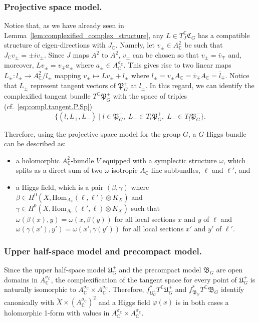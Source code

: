 \documentclass[oneside,11pt]{amsart}
\theoremstyle{definition}
\theoremstyle{remark}
\numberwithin{thm}{section}
\numberwithin{equation}{section}
\begin{document}
\subsubsection{Projective space model.}\label{df:SpR-Higgs-proj}

Notice that, as we have already seen in Lemma~\ref{lem:complexified_complex_structure}, any $L \in T^\mathbb C_{J}\mathfrak{C}_G$ has a compatible structure of eigen-directions with $J_\mathbb C$. Namely, let $v_\pm\in A_\mathbb C^2$ be such that $J_\mathbb C v_\pm=\pm i v_\pm$. Since $J$ maps $A^2$ to $A^2$, $v_\pm$ can be chosen so that $v_\pm=\bar v_\mp$ and, moreover, $Lv_\pm=v_\mp a_\pm$ where $a_\pm\in A_\mathbb C^{\sigma_\mathbb C}$. This gives rise to two linear maps $L_\pm\colon l_\pm\to A_\mathbb C^2/l_\pm$ mapping $v_\pm\mapsto Lv_\pm+l_\pm$ where $l_\pm=v_\pm A_\mathbb C=\bar v_\mp A_\mathbb C=\bar l_\mp$. Notice that $L_\pm$ represent tangent vectors of $\mathfrak{P}_G^+$ at $l_\pm$. In this regard, we can identify the complexified tangent bundle  $T^\mathbb C\mathfrak{P}_G^+$ with the space of triples (cf.~\eqref{eq:compl.tangent.P.Sp})
$$\{(l,L_+,L_-)\mid l\in\mathfrak{P}_G^+,\;L_+\in T_l\mathfrak{P}_G^+,\; L_-\in T_{\bar l}\mathfrak{P}_G^-\}.$$

Therefore, using the projective space model for the group $G$, a $G$-Higgs bundle can be described as: 
\begin{itemize}
    \item a holomorphic $A^2_{\mathbb{C}}$-bundle $V$ equipped with a symplectic structure $\omega$, which splits as a direct sum of two $\omega$-isotropic $A_{\mathbb{C}}$-line subbundles, $\ell$ and $\ell'$, and
    \item a Higgs field, which is a pair $(\beta,\gamma)$ where $\beta\in H^0(X,\mathrm{Hom}_{A_\mathbb C}(\ell,\ell')\otimes K_X)$ and $\gamma\in H^0(X,\mathrm{Hom}_{A_\mathbb C}(\ell',\ell)\otimes K_X)$ such that $\omega(\beta(x),y)=\omega(x,\beta(y))$ for all local sections $x$ and $y$ of $\ell$ and $\omega(\gamma(x'),y')=\omega(x',\gamma(y'))$ for all local sections $x'$ and $y'$ of $\ell'$. 
\end{itemize}

\subsubsection{Upper half-space model and precompact model.} Since the upper half-space model $\mathfrak U_G^+$ and the precompact model $\mathfrak{B}_G$ are open domains in $A_\mathbb C^{\sigma_\mathbb C}$, the complexification of the tangent space for every point of $\mathfrak U_G^+$ is naturally isomorphic to  $A_\mathbb C^{\sigma_\mathbb C}\times A_\mathbb C^{\sigma_\mathbb C}$. Therefore, $f^*_{\mathfrak U_G^+} T^\mathbb C\mathfrak U_G^+$ and $f^*_{\mathfrak{B}_G} T^\mathbb C\mathfrak{B}_G$ identify canonically with $\tilde X\times (A_\mathbb C^{\sigma_\mathbb C})^2$ and a Higgs field $\varphi(x)$ is in both cases a holomorphic 1-form with values in $A_\mathbb C^{\sigma_{\mathbb{C}}}\times A_\mathbb C^{\sigma_\mathbb C}$.
\end{document}
